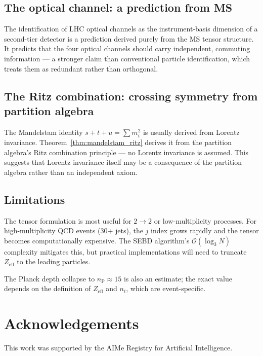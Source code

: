\documentclass[twocolumn,10pt,a4paper]{article}
\theoremstyle{thmstyle}
\theoremstyle{definition}
\theoremstyle{remark}
\newcommand{\nP}{n_{\mathrm{P}}}
\begin{document}
\subsection{The optical channel: a prediction from MS}

The identification of LHC optical channels as the instrument-basis dimension
of a second-tier detector is a prediction derived purely from the MS tensor
structure.  It predicts that the four optical channels should carry
independent, commuting information — a stronger claim than conventional
particle identification, which treats them as redundant rather than
orthogonal.

\subsection{The Ritz combination: crossing symmetry from partition algebra}

The Mandelstam identity $s + t + u = \sum m_i^2$ is usually derived from
Lorentz invariance.  Theorem~\ref{thm:mandelstam_ritz} derives it from the
partition algebra's Ritz combination principle — no Lorentz invariance is
assumed.  This suggests that Lorentz invariance itself may be a consequence
of the partition algebra rather than an independent axiom.

\subsection{Limitations}

The tensor formulation is most useful for $2\to 2$ or low-multiplicity
processes.  For high-multiplicity QCD events (30+ jets), the $j$ index
grows rapidly and the tensor becomes computationally expensive.  The SEBD
algorithm's $\mathcal{O}(\log_3 N)$ complexity mitigates this, but practical
implementations will need to truncate $Z_\text{eff}$ to the leading
particles.

The Planck depth collapse to $\nP \approx 15$ is also an estimate;
the exact value depends on the definition of $Z_\text{eff}$ and $n_t$,
which are event-specific.

\section*{Acknowledgements}
This work was supported by the AIMe Registry for Artificial Intelligence.



\end{document}
